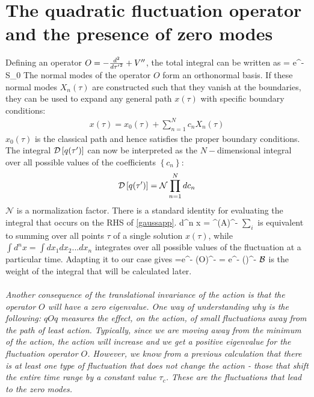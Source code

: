 \documentclass[12pt,onecolumn]{revtex4-2}
\begin{document}
\section{The quadratic fluctuation operator and the presence of zero modes}
Defining an operator \(O = -\frac{d^2}{d{\tau^\prime}^2} + V^{\prime\prime}\), the total integral can be written as
\beq[gaussapp]
\int {} = e^{-S_0} \int {}
\eeq
The normal modes of the operator \(O\) form an orthonormal basis. If these normal modes \(X_n(\tau)\) are constructed such that they vanish at the boundaries, they can be used to expand any general path \(x(\tau)\) with specific boundary conditions:
\begin{equation}\begin{aligned}
	x(\tau) = x_0(\tau) + \sum_{n=1}^N c_n X_n(\tau)
\end{aligned}\end{equation}
\(x_0(\tau)\) is the classical path and hence satisfies the proper boundary conditions. The integral \(\mathcal{D}\left[{q(\tau^\prime)}\right]\) can now be interpreted as the \(N-\)dimensional integral over all possible values of the coefficients \(\left\{ c_n \right\} \):
\begin{equation}\begin{aligned}
	\mathcal{D}\left[{q(\tau^\prime)}\right] = \mathcal{N}\prod_{n=1}^N dc_n
\end{aligned}\end{equation}
\(\mathcal{N}\) is a normalization factor. There is a standard identity for evaluating the integral that occurs on the RHS of  \ref{gaussapp}.
\beq
\int d^n x  = \rr{2\pi}^\left(\;A\right)^{-}
\eeq
\(\sum_i\) is equivalent to summing over all points \(\tau\) of a single solution \(x(\tau)\), while \(\int d^n x = \int d x_1 d x_2 ... dx_n\) integrates over all possible values of the fluctuation at a particular time.
Adapting it to our case gives
\beq
\int {} =e^{-}  \left(\;O\right)^{-} = e^{-}  \left(\right)^{- }
\eeq
\(\mathcal{B}\) is the weight of the integral that will be calculated later. 
\\\\
\textit{Another consequence of the translational invariance of the action is that the operator \(O\) will have a zero eigenvalue. One way of understanding why is the following: \(qOq\) measures the effect, on the action, of small fluctuations away from the path of least action. Typically, since we are moving away from the minimum of the action, the action will increase and we get a positive eigenvalue for the fluctuation operator \(O\). However, we know from a previous calculation that there is at least one type of fluctuation that does not change the action - those that shift the entire time range by a constant value \(\tau_c\). These are the fluctuations that lead to the zero modes.}\\\\
\end{document}
